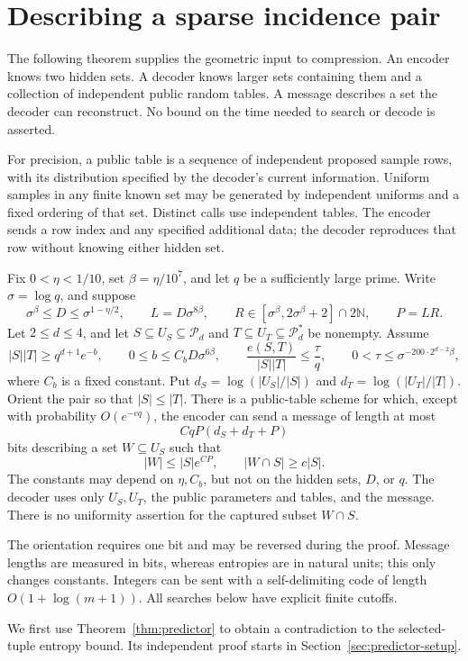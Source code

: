 \section{Describing a sparse incidence pair}
\label{sec:predictor-statement}

The following theorem supplies the geometric input to compression.
An encoder knows two hidden sets. A decoder knows larger sets
containing them and a collection of independent public random
tables. A message describes a set the decoder can reconstruct.
No bound on the time needed to search or decode is asserted.

For precision, a public table is a sequence of independent proposed
sample rows, with its distribution specified by the decoder's
current information. Uniform samples in any finite known set may
be generated by independent uniforms and a fixed ordering of that
set. Distinct calls use independent tables. The encoder sends a
row index and any specified additional data; the decoder reproduces
that row without knowing either hidden set.

\begin{theorem}
\label{thm:predictor}
Fix \(0<\eta<1/10\), set \(\beta=\eta/10^7\), and let \(q\) be a
sufficiently large prime. Write \(\sigma=\log q\), and suppose
\[
 \sigma^\beta\le D\le\sigma^{1-\eta/2},\qquad
 L=D\sigma^{8\beta},\qquad
 R\in[\sigma^\beta,2\sigma^\beta+2]\cap2\mathbb N,\qquad P=LR.
\]
Let \(2\le d\le4\), and let
\(S\subseteq U_S\subseteq\mathcal P_d\) and
\(T\subseteq U_T\subseteq\mathcal P_d^*\) be nonempty. Assume
\[
 |S||T|\ge q^{d+1}e^{-b},\qquad
 0\le b\le C_bD\sigma^{6\beta},\qquad
 \frac{e(S,T)}{|S||T|}\le\frac{\tau}{q},\qquad
 0<\tau\le\sigma^{-200\cdot2^{d-2}\beta},
\]
where \(C_b\) is a fixed constant.
Put \(d_S=\log(|U_S|/|S|)\) and \(d_T=\log(|U_T|/|T|)\).
Orient the pair so that \(|S|\le|T|\).
There is a public-table scheme for which, except with probability
\(O(e^{-cq})\), the encoder can send a message of length at most
\[
 CqP(d_S+d_T+P)
\]
bits describing a set \(W\subseteq U_S\) such that
\[
 |W|\le |S|e^{CP},\qquad |W\cap S|\ge c|S|.
\]
The constants may depend on \(\eta,C_b\), but not on the hidden sets,
\(D\), or \(q\). The decoder uses only \(U_S,U_T\), the public
parameters and tables, and the message. There is no uniformity
assertion for the captured subset \(W\cap S\).
\end{theorem}

The orientation requires one bit and may be reversed during the
proof. Message lengths are measured in bits, whereas entropies are
in natural units; this only changes constants. Integers can be
sent with a self-delimiting code of length \(O(1+\log(m+1))\).
All searches below have explicit finite cutoffs.

We first use Theorem~\ref{thm:predictor} to obtain a contradiction
to the selected-tuple entropy bound. Its independent proof starts
in Section~\ref{sec:predictor-setup}.
